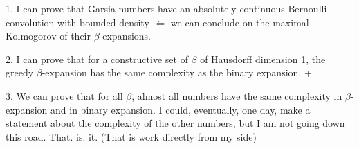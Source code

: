 1. I can prove that Garsia numbers have an absolutely continuous Bernoulli convolution with bounded density $\Leftarrow$ we can conclude on the maximal Kolmogorov of their $\beta$-expansions. \cite{baker2014approximation}

2. I can prove that for a constructive set of $\beta$ of Hausdorff dimension 1, the greedy $\beta$-expansion has the same complexity as the binary expansion. \cite{schmerling1995symbolic} + \cite{fai2012lengths}

3. We can prove that for all $\beta$, almost all numbers have the same complexity in $\beta$-expansion and in binary expansion. I could, eventually, one day, make a statement about the complexity of the other numbers, but I am not going down this road. That. is. it. (That is work directly from my side)

%     
%     
